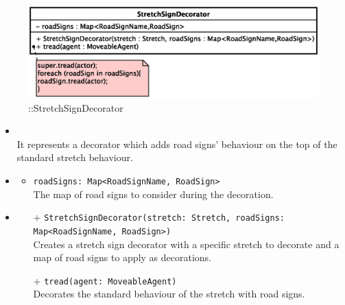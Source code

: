\begin{figure}[h]
\centering
\includegraphics[scale=0.6,keepaspectratio]{images/solution/app/backend/stretch_sign_decorator.eps}
\caption{\pReactiveComponentStretchDecoration::StretchSignDecorator}
\label{fig:sd-app-stretch_sign_decorator}
\end{figure}
\FloatBarrier
\begin{itemize}
  \item \textbf{\descr} \\
    It represents a decorator which adds road signs' behaviour on the top of the
    standard stretch behaviour. 
  \item \textbf{\attrs}
  \begin{itemize}
    \item \texttt{roadSigns: Map<RoadSignName, RoadSign>} \\
The map of road signs to consider during the decoration.
  \end{itemize}
  \item \textbf{\ops}
   \begin{itemize} 
   \item[+] \texttt{StretchSignDecorator(stretch: Stretch, roadSigns: Map<RoadSignName, RoadSign>)} \\
Creates a stretch sign decorator with a specific stretch to decorate and a map of road signs to apply as decorations.
    \item[+] \texttt{tread(agent: MoveableAgent)} \\
Decorates the standard behaviour of the stretch with road signs.  
  \end{itemize}
\end{itemize}
